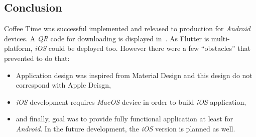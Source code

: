 \subsection{Conclusion}
Coffee Time was successful implemented and released to production for \textit{Android} devices. A \textit{QR} code for downloading is displayed in~. As Flutter is multi-platform, \textit{iOS} could be deployed too. However there were a few ``obstacles'' that prevented to do that:

\begin{itemize}
    \item Application design was inspired from Material Design and this design do not correspond with Apple Deisgn,
    \item \textit{iOS} development requires \textit{MacOS} device in order to build \textit{iOS} application,
    \item and finally, goal was to provide fully functional application at least for \textit{Android}. In the future development, the \textit{iOS} version is planned as well. 
\end{itemize}